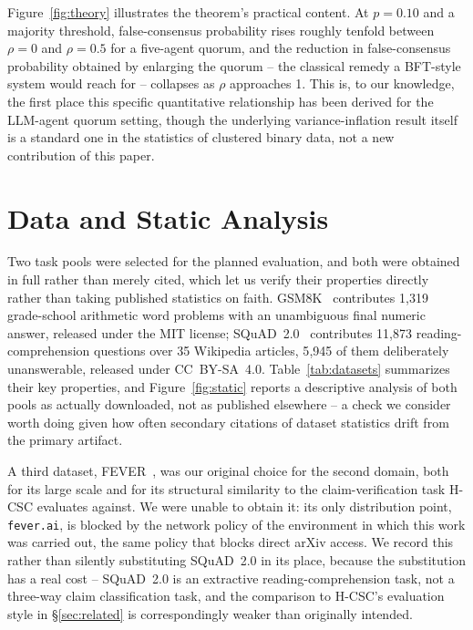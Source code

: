 \documentclass[journal]{IEEEtran}
\begin{document}
Figure~\ref{fig:theory} illustrates the theorem's practical content. At $p=0.10$ and a majority threshold, false-consensus probability rises roughly tenfold between $\rho=0$ and $\rho=0.5$ for a five-agent quorum, and the reduction in false-consensus probability obtained by enlarging the quorum -- the classical remedy a BFT-style system would reach for -- collapses as $\rho$ approaches 1. This is, to our knowledge, the first place this specific quantitative relationship has been derived for the LLM-agent quorum setting, though the underlying variance-inflation result itself is a standard one in the statistics of clustered binary data, not a new contribution of this paper.

\section{Data and Static Analysis}
\label{sec:data}

Two task pools were selected for the planned evaluation, and both were obtained in full rather than merely cited, which let us verify their properties directly rather than taking published statistics on faith. GSM8K~\cite{cobbe2021gsm8k} contributes 1{,}319 grade-school arithmetic word problems with an unambiguous final numeric answer, released under the MIT license; SQuAD~2.0~\cite{rajpurkar2018squad2} contributes 11{,}873 reading-comprehension questions over 35 Wikipedia articles, 5{,}945 of them deliberately unanswerable, released under CC~BY-SA~4.0. Table~\ref{tab:datasets} summarizes their key properties, and Figure~\ref{fig:static} reports a descriptive analysis of both pools as actually downloaded, not as published elsewhere -- a check we consider worth doing given how often secondary citations of dataset statistics drift from the primary artifact.

A third dataset, FEVER~\cite{thorne2018fever}, was our original choice for the second domain, both for its large scale and for its structural similarity to the claim-verification task H-CSC evaluates against. We were unable to obtain it: its only distribution point, \texttt{fever.ai}, is blocked by the network policy of the environment in which this work was carried out, the same policy that blocks direct arXiv access. We record this rather than silently substituting SQuAD~2.0 in its place, because the substitution has a real cost -- SQuAD~2.0 is an extractive reading-comprehension task, not a three-way claim classification task, and the comparison to H-CSC's evaluation style in \S\ref{sec:related} is correspondingly weaker than originally intended.
\end{document}
